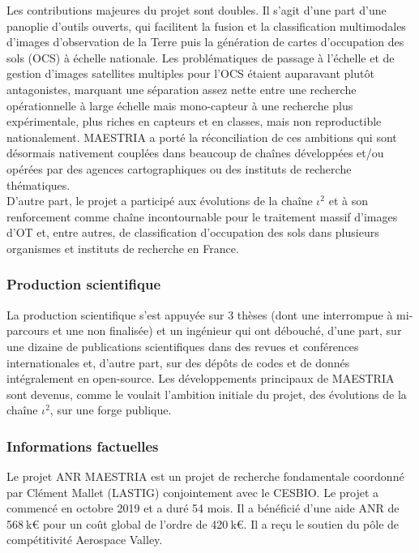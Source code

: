 Les contributions majeures du projet sont doubles. Il s’agit d’une part d’une panoplie d’outils ouverts, qui facilitent la fusion et la classification multimodales d’images d’observation de la Terre puis la génération de cartes d’occupation des sols (OCS) à échelle nationale. Les problématiques de passage à l’échelle et de gestion d’images satellites multiples pour l’OCS étaient auparavant plutôt antagonistes, marquant une séparation assez nette entre une recherche opérationnelle à large échelle mais mono-capteur à une recherche plus expérimentale, plus riches en capteurs et en classes, mais non reproductible nationalement. MAESTRIA a porté la réconciliation de ces ambitions qui sont désormais nativement couplées dans beaucoup de chaînes développées et/ou opérées par des agences cartographiques ou des instituts de recherche thématiques.\\
D’autre part, le projet a participé aux évolutions de la chaîne $\iota^2$ et à son renforcement comme chaîne incontournable pour le traitement massif d’images d’OT et, entre autres, de classification d’occupation des sols dans plusieurs organismes et instituts de recherche en France.


\subsubsection*{Production scientifique}
La production scientifique s’est appuyée sur 3 thèses (dont une interrompue à mi-parcours et une non finalisée) et un ingénieur qui ont débouché, d’une part,  sur une dizaine de publications scientifiques dans des revues et conférences internationales et, d’autre part, sur des dépôts de codes et de donnés intégralement en open-source. Les développements principaux de MAESTRIA sont devenus, comme le voulait l’ambition initiale du projet, des évolutions de la chaîne \href{https://framagit.org/iota2-project/iota2}{$\iota^2$}, sur une forge publique.

\subsubsection*{Informations factuelles}

Le projet ANR MAESTRIA est un projet de recherche fondamentale coordonné par Clément Mallet (LASTIG) conjointement avec le CESBIO. Le projet a commencé en octobre 2019 et a duré 54 mois. Il a bénéficié d’une aide ANR de 568$\:$k€ pour un coût global de l’ordre de 420$\:$k€. Il a reçu le soutien du pôle de compétitivité Aerospace Valley.

